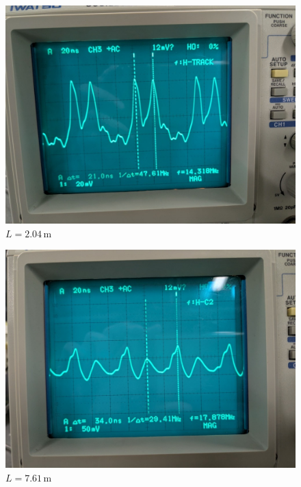 \documentclass{jarticle}
\begin{document}
\begin{figure}[H]
  \begin{center}
    \includegraphics[scale=0.3]{cable1_result_picture.jpg}
    \caption{$L=2.04\,\mathrm{m}$}
  \end{center}
\end{figure}

\begin{figure}[H]
  \begin{center}
    \includegraphics[scale=0.3]{cable2_result_picture.jpg}
    \caption{$L=7.61\,\mathrm{m}$}
  \end{center}
\end{figure}
\end{document}
